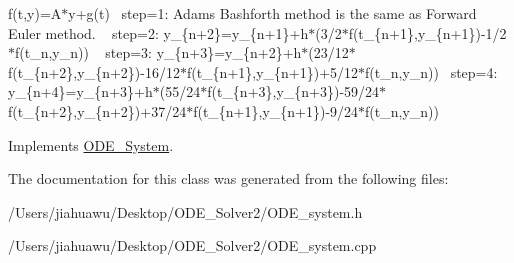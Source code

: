 f(t,y)=A$\ast$y+g(t)~\newline
step=1\+: Adams Bashforth method is the same as Forward Euler method. ~\newline
step=2\+: y\+\_\+\{n+2\}=y\+\_\+\{n+1\}+h$\ast$(3/2$\ast$f(t\+\_\+\{n+1\},y\+\_\+\{n+1\})-\/1/2$\ast$f(t\+\_\+n,y\+\_\+n)) ~\newline
step=3\+: y\+\_\+\{n+3\}=y\+\_\+\{n+2\}+h$\ast$(23/12$\ast$f(t\+\_\+\{n+2\},y\+\_\+\{n+2\})-\/16/12$\ast$f(t\+\_\+\{n+1\},y\+\_\+\{n+1\})+5/12$\ast$f(t\+\_\+n,y\+\_\+n))~\newline
step=4\+: y\+\_\+\{n+4\}=y\+\_\+\{n+3\}+h$\ast$(55/24$\ast$f(t\+\_\+\{n+3\},y\+\_\+\{n+3\})-\/59/24$\ast$f(t\+\_\+\{n+2\},y\+\_\+\{n+2\})+37/24$\ast$f(t\+\_\+\{n+1\},y\+\_\+\{n+1\})-\/9/24$\ast$f(t\+\_\+n,y\+\_\+n)) ~\newline


Implements \mbox{\hyperlink{class_o_d_e___system_a78a058382148b745fa458f0b9f52f47c}{O\+D\+E\+\_\+\+System}}.



The documentation for this class was generated from the following files\+:\begin{DoxyCompactItemize}
\item 
/\+Users/jiahuawu/\+Desktop/\+O\+D\+E\+\_\+\+Solver2/O\+D\+E\+\_\+system.\+h\item 
/\+Users/jiahuawu/\+Desktop/\+O\+D\+E\+\_\+\+Solver2/O\+D\+E\+\_\+system.\+cpp\end{DoxyCompactItemize}
